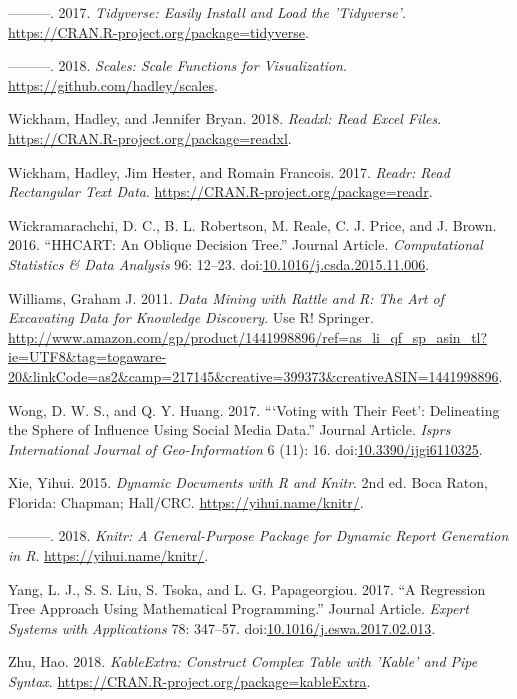 \documentclass[]{elsarticle} %
\begin{document}
\hypertarget{ref-Wickham2017}{}
---------. 2017. \emph{Tidyverse: Easily Install and Load the
'Tidyverse'}. \url{https://CRAN.R-project.org/package=tidyverse}.

\hypertarget{ref-Wickham2018scales}{}
---------. 2018. \emph{Scales: Scale Functions for Visualization}.
\url{https://github.com/hadley/scales}.

\hypertarget{ref-Wickham2018}{}
Wickham, Hadley, and Jennifer Bryan. 2018. \emph{Readxl: Read Excel
Files}. \url{https://CRAN.R-project.org/package=readxl}.

\hypertarget{ref-Wickham2017readr}{}
Wickham, Hadley, Jim Hester, and Romain Francois. 2017. \emph{Readr:
Read Rectangular Text Data}.
\url{https://CRAN.R-project.org/package=readr}.

\hypertarget{ref-Wickramarachchi2016}{}
Wickramarachchi, D. C., B. L. Robertson, M. Reale, C. J. Price, and J.
Brown. 2016. ``HHCART: An Oblique Decision Tree.'' Journal Article.
\emph{Computational Statistics \& Data Analysis} 96: 12--23.
doi:\href{https://doi.org/10.1016/j.csda.2015.11.006}{10.1016/j.csda.2015.11.006}.

\hypertarget{ref-Williams2011}{}
Williams, Graham J. 2011. \emph{Data Mining with Rattle and R: The Art
of Excavating Data for Knowledge Discovery}. Use R! Springer.
\url{http://www.amazon.com/gp/product/1441998896/ref=as_li_qf_sp_asin_tl?ie=UTF8\&tag=togaware-20\&linkCode=as2\&camp=217145\&creative=399373\&creativeASIN=1441998896}.

\hypertarget{ref-Wong2017}{}
Wong, D. W. S., and Q. Y. Huang. 2017. ```Voting with Their Feet':
Delineating the Sphere of Influence Using Social Media Data.'' Journal
Article. \emph{Isprs International Journal of Geo-Information} 6 (11):
16. doi:\href{https://doi.org/10.3390/ijgi6110325}{10.3390/ijgi6110325}.

\hypertarget{ref-Xie2015}{}
Xie, Yihui. 2015. \emph{Dynamic Documents with R and Knitr}. 2nd ed.
Boca Raton, Florida: Chapman; Hall/CRC. \url{https://yihui.name/knitr/}.

\hypertarget{ref-Xie2018}{}
---------. 2018. \emph{Knitr: A General-Purpose Package for Dynamic
Report Generation in R}. \url{https://yihui.name/knitr/}.

\hypertarget{ref-Yang2017}{}
Yang, L. J., S. S. Liu, S. Tsoka, and L. G. Papageorgiou. 2017. ``A
Regression Tree Approach Using Mathematical Programming.'' Journal
Article. \emph{Expert Systems with Applications} 78: 347--57.
doi:\href{https://doi.org/10.1016/j.eswa.2017.02.013}{10.1016/j.eswa.2017.02.013}.

\hypertarget{ref-Zhu2018}{}
Zhu, Hao. 2018. \emph{KableExtra: Construct Complex Table with 'Kable'
and Pipe Syntax}. \url{https://CRAN.R-project.org/package=kableExtra}.
\end{document}
